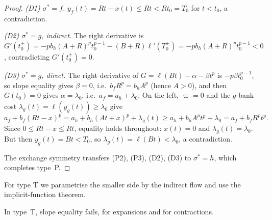 \begin{proof}
\emph{(D1) $\sigma^*=f$.} $y_f(t)=Rt-x(t)\le Rt<Rt_0=T_0$ for $t<t_0$, a
contradiction.

\emph{(D2) $\sigma^*=g$, indirect.} The right derivative is
$G'(t_0^+)=-pb_h(A+R)^pt_0^{p-1}-(B+R)\ell'(T_0^+)=-pb_h(A+R)^pt_0^{p-1}<0$,
contradicting $G'(t_0^+)=0$.

\emph{(D3) $\sigma^*=g$, direct.} The right derivative of
$G=\ell(Bt)-\alpha-\beta t^p$ is $-p\beta t_0^{p-1}$, so slope equality gives
$\beta=0$, i.e.\ $b_fR^p=b_hA^p$ (hence $A>0$), and then $G(t_0)=0$ gives
$\alpha=\lambda_0$, i.e.\ $a_f=a_h+\lambda_0$. On the left, $\varpi=0$
and the $g$-bank cost $\lambda_g(t)=\ell(y_g(t))\ge\lambda_0$ give
\[
 a_f+b_f(Rt-x)^p=a_h+b_h(At+x)^p+\lambda_g(t)
 \ge a_h+b_hA^pt^p+\lambda_0=a_f+b_fR^pt^p .
\]
Since $0\le Rt-x\le Rt$, equality holds throughout: $x(t)=0$ and
$\lambda_g(t)=\lambda_0$. But then $y_g(t)=Bt<T_0$, so
$\lambda_g(t)=\ell(Bt)<\lambda_0$, a contradiction.

The exchange symmetry transfers (P2), (P3), (D2), (D3) to $\sigma^*=h$, which
completes type~P.
\end{proof}

For type T we parametrise the smaller side by the indirect flow and use the
implicit-function theorem.

\begin{lemma}\label{lem:typeT}
In type~T, slope equality fails, for expansions and for contractions.
\end{lemma}

